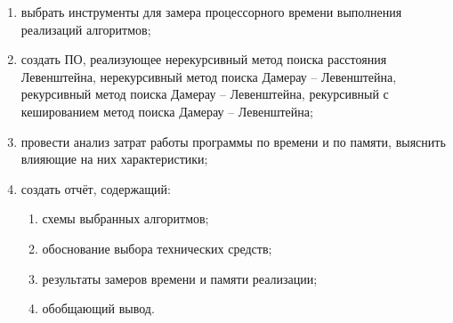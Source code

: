 \begin{enumerate}[label=\arabic*)]
	\item выбрать инструменты для замера процессорного времени выполнения реализаций алгоритмов;
	\item создать ПО, реализующее нерекурсивный метод поиска расстояния Левенштейна, нерекурсивный метод поиска Дамерау -- Левенштейна, рекурсивный метод поиска Дамерау -- Левенштейна, рекурсивный с кешированием метод поиска Дамерау -- Левенштейна;
	\item провести анализ затрат работы программы по времени и по памяти, выяснить влияющие на них характеристики;
	\item создать отчёт, содержащий:
	\begin{enumerate}
		\item схемы выбранных алгоритмов;
		\item обоснование выбора технических средств;
		\item результаты замеров времени и памяти реализации;
		\item обобщающий вывод.
	\end{enumerate}
\end{enumerate}
